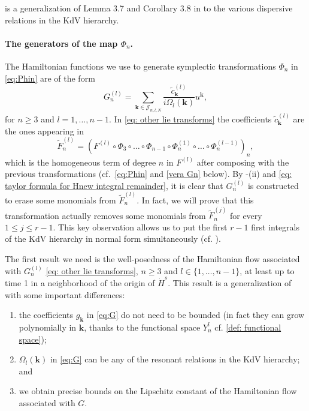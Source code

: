 \documentclass[a4paper,10pt,reqno]{article}
\theoremstyle{definition}
\theoremstyle{plain}
\theoremstyle{plain}
\theoremstyle{definition}
\theoremstyle{plain}
\theoremstyle{plain}
\theoremstyle{plain}
\theoremstyle{definition}
\theoremstyle{definition}
\def \k{\bm{k}}
\begin{document}
 is a generalization of Lemma 3.7 and Corollary 3.8 in \cite{bernier} to the various dispersive relations in the KdV hierarchy.

\paragraph{The generators of the map $\Phi_n$.}

The Hamiltonian functions we use to generate symplectic transformations $\Phi_n$ in \eqref{eq:Phin} are of the form
\begin{equation}
G_n^{(l)} = \sum_{\bm{k} \in \mathcal{J}_{n,l,N}} \frac{\widetilde{c}_{\k}^{(l)}}{i \Omega_l(\bm{k})} u^{\bm{k}},
\label{eq: other lie transforms}
\end{equation}
for $n \ge 3$ and $l =1,\ldots,n-1.$ 
In \eqref{eq: other lie transforms} the coefficients $\widetilde{c}_{\k}^{(l)}$ are the ones appearing in 
\[
\widetilde{F}_n^{(l)} = \left ( F^{(l)} \circ \Phi_{3}\circ\ldots\circ \Phi_{n-1} \circ \Phi_n^{(1)} \circ \ldots \circ \Phi_n^{(l-1)} \right )_n, 
\]
which is the homogeneous term of degree $n$ in $F^{(l)}$ after composing with the previous transformations (cf.~\eqref{eq:Phin} and \eqref{vera Gn} below). 
By -(ii) and \eqref{eq: taylor formula for Hnew integral remainder}, it is clear that $G_n^{(l)}$ is constructed to erase some monomials from $\widetilde{F}_n^{(l)}$. 
In fact, we will prove that this transformation actually removes some monomials from $\widetilde{F}_n^{(j)}$ for every $1\leq j\leq r-1$. 
This key observation allows us to put the first $r-1$ first integrals of the KdV hierarchy in normal form simultaneously (cf. ).

The first result we need is the well-posedness of the Hamiltonian flow associated with $G_n^{(l)}$ \eqref{eq: other lie transforms}, $n \ge 3$ and $l \in \{1,\ldots,n-1\}$,
at least up to time 1 in a neighborhood of the origin of $\dot{H}^s$.
This result is a generalization of \cite[Lemma 3.6]{bernier} with some important differences: 
\begin{enumerate}
\item[(i)] the coefficients $g_{\k}$ in \eqref{eq:G} do not need to be bounded (in fact they can grow polynomially in $\k$, thanks to the functional space $Y_n^l$ cf. \eqref{def: functional space});
\item[(ii)] $\Omega_l(\k)$ in \eqref{eq:G} can be any of the resonant relations in the KdV hierarchy; and
\item[(iii)] we obtain precise bounds on the Lipschitz constant of the Hamiltonian flow associated with $G$.
\end{enumerate}
\end{document}
